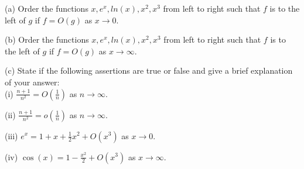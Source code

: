 \documentclass[12pt]{article}
\begin{document}
\studentinfo
{}
\finishfirstpage

\newpage


\noindent 
(a) Order the functions $x, e^x, ln(x), x^2, x^3$ from left to right such that $f$ is to the left of $g$ if $f=O(g)$ as $x \to 0$. \\

\vspace{1 in}

\noindent
(b) Order the functions $x, e^x, ln(x), x^2, x^3$ from left to right such that $f$ is to the left of $g$ if $f=O(g)$ as $x \to \infty$. \\

\vspace{1 in}

\noindent
(c) State if the following assertions are true or false and give a brief explanation of your answer: \\
(i) $\frac{n+1}{n^2} = O(\frac{1}{n})$ as $n \to \infty$. \\

\vspace{1in}

\noindent
(ii) $\frac{n+1}{n^2}=o(\frac{1}{n})$ as $n \to \infty$. \\

\vspace{1in}

\noindent
(iii) $e^x = 1+x+\frac{1}{2}x^2 + O(x^3)$ as $x \to 0$. \\

\vspace{1in}

\noindent
(iv) $\cos(x) = 1-\frac{x^2}{2} + O(x^3)$ as $x \to \infty$. \\
\end{document}
